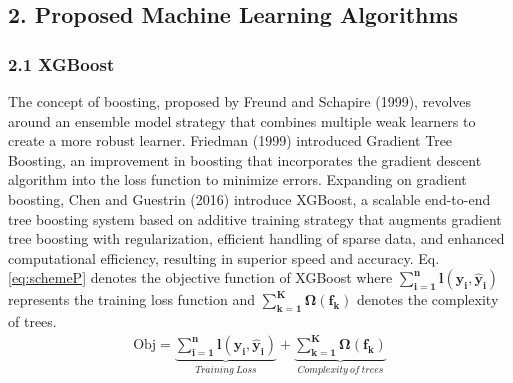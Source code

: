 \documentclass[10pt,letterpaper]{article}
\begin{document}
\subsection*{2. Proposed Machine Learning Algorithms}

\subsubsection*{2.1 XGBoost}
 The concept of boosting, proposed by Freund and Schapire (1999), revolves around an ensemble model strategy that combines multiple weak learners to create a more robust learner. Friedman (1999) introduced Gradient Tree Boosting, an improvement in boosting that incorporates the gradient descent algorithm into the loss function to minimize errors. Expanding on gradient boosting, Chen and Guestrin (2016) introduce XGBoost, a scalable end-to-end tree boosting system based on additive training strategy that augments gradient tree boosting with regularization, efficient handling of sparse data, and enhanced computational efficiency, resulting in superior speed and accuracy. Eq.\ref{eq:schemeP} denotes the objective function of XGBoost where \(\mathbf{\sum_{i=1}^{n}l(y_i,\hat{y}_i)}\) represents the training loss function and \(\mathbf{{\sum_{k=1}^{K}}\Omega(f_k)}\) denotes the complexity of trees.
\begin{eqnarray}
\label{eq:schemeP}
\mathrm{Obj}=\underbrace{\mathbf{\sum_{i=1}^{n}l(y_i,\hat{y}_i)}}_{Training \: Loss} +\underbrace{\mathbf{{\sum_{k=1}^{K}}\Omega(f_k)}}_{Complexity \: of \: trees}
\end{eqnarray}
\end{document}
